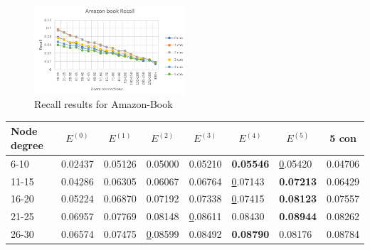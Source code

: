 \begin{figure}[h!]
    \includegraphics[width=0.5\textwidth]{figures/evaluation/amazon-book-recall.png}
    \centering
    \caption{Recall results for Amazon-Book}
    \label{fig:recall-yelp2020-individual-embedding-evaluation}
\end{figure}


\begin{table}[h!]
    \centering
    \begin{tabular}{|l|l|l|l|l|l|l||l|}
        \hline
        Node degree & \multicolumn{1}{c|}{$E^{(0)}$} & \multicolumn{1}{c|}{$E^{(1)}$} & \multicolumn{1}{c|}{$E^{(2)}$} & \multicolumn{1}{c|}{$E^{(3)}$} & \multicolumn{1}{c|}{$E^{(4)}$} & \multicolumn{1}{c||}{$E^{(5)}$} & \multicolumn{1}{c|}{5 con} \\ \hline
        6-10        & 0.02437                        & 0.05126                        & 0.05000                        & 0.05210                        & \textbf{0.05546}               & {\ul 0.05420}                   & 0.04706                    \\ \hline
        11-15       & 0.04286                        & 0.06305                        & 0.06067                        & 0.06764                        & {\ul 0.07143}                  & \textbf{0.07213}                & 0.06429                    \\ \hline
        16-20       & 0.05224                        & 0.06870                        & 0.07192                        & 0.07338                        & {\ul 0.07415}                  & \textbf{0.08123}                & 0.07557                    \\ \hline
        21-25       & 0.06957                        & 0.07769                        & 0.08148                        & {\ul 0.08611}                  & 0.08430                        & \textbf{0.08944}                & 0.08262                    \\ \hline
        26-30       & 0.06574                        & 0.07475                        & {\ul 0.08599}                  & 0.08492                        & \textbf{0.08790}               & 0.08176                         & 0.08784                    \\ \hline

\end{tabular}
\end{table}
